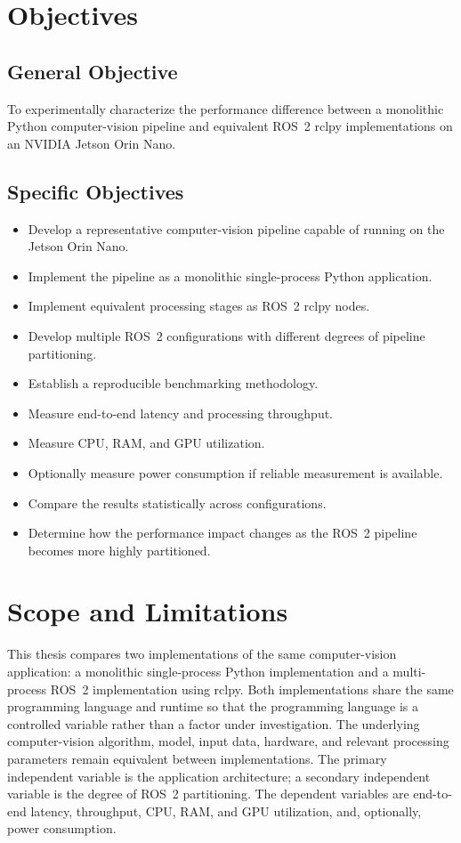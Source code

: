 \section{Objectives}
\label{sec:objectives}

\subsection{General Objective}

To experimentally characterize the performance difference between a
monolithic Python computer-vision pipeline and equivalent ROS~2 rclpy
implementations on an NVIDIA Jetson Orin Nano.

\subsection{Specific Objectives}

\begin{itemize}
  \item Develop a representative computer-vision pipeline capable of
        running on the Jetson Orin Nano.
  \item Implement the pipeline as a monolithic single-process Python
        application.
  \item Implement equivalent processing stages as ROS~2 rclpy nodes.
  \item Develop multiple ROS~2 configurations with different degrees of
        pipeline partitioning.
  \item Establish a reproducible benchmarking methodology.
  \item Measure end-to-end latency and processing throughput.
  \item Measure CPU, RAM, and GPU utilization.
  \item Optionally measure power consumption if reliable measurement is
        available.
  \item Compare the results statistically across configurations.
  \item Determine how the performance impact changes as the ROS~2
        pipeline becomes more highly partitioned.
\end{itemize}

\section{Scope and Limitations}
\label{sec:scope}

This thesis compares two implementations of the same computer-vision
application: a monolithic single-process Python implementation and a
multi-process ROS~2 implementation using rclpy. Both implementations share
the same programming language and runtime so that the programming language
is a controlled variable rather than a factor under investigation. The
underlying computer-vision algorithm, model, input data, hardware, and
relevant processing parameters remain equivalent between implementations.
The primary independent variable is the application architecture; a
secondary independent variable is the degree of ROS~2 partitioning. The
dependent variables are end-to-end latency, throughput, CPU, RAM, and GPU
utilization, and, optionally, power consumption.

